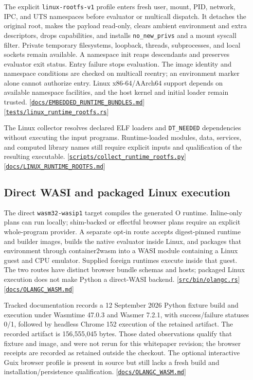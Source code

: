 \documentclass[11pt,oneside]{article}
\newcommand{\src}[1]{\textcolor{OSlate}{\scriptsize[\href{https://github.com/lostadi/OSTADIX/blob/c0b02c326b2329a95ba52447c7180bc93957cd57/#1}{\nolinkurl{#1}}]}\allowbreak}
\begin{document}
The explicit \texttt{linux-rootfs-v1} profile enters fresh user, mount, PID,
network, IPC, and UTS namespaces before evaluator or multicall dispatch. It
detaches the original root, makes the payload read-only, clears ambient
environment and extra descriptors, drops capabilities, and installs
\texttt{no\_new\_privs} and a mount syscall filter. Private temporary
filesystems, loopback, threads, subprocesses, and local sockets remain
available. A namespace init reaps descendants and preserves evaluator exit
status. Entry failure stops evaluation. The image identity and namespace
conditions are checked on multicall reentry; an environment marker alone
cannot authorize entry. Linux x86-64/AArch64 support depends on available
namespace facilities, and the host kernel and initial loader remain trusted.
\src{docs/EMBEDDED_RUNTIME_BUNDLES.md}
\src{tests/linux_runtime_rootfs.rs}

The Linux collector resolves declared ELF loaders and \texttt{DT\_NEEDED}
dependencies without executing the input programs. Runtime-loaded modules,
data, services, and computed library names still require explicit inputs and
qualification of the resulting executable.
\src{scripts/collect_runtime_rootfs.py}
\src{docs/LINUX_RUNTIME_ROOTFS.md}

\subsection{Direct WASI and packaged Linux execution}

The direct \texttt{wasm32-wasip1} target compiles the generated O runtime.
Inline-only plans can run locally; shim-backed or effectful browser plans
require an explicit whole-program provider. A separate opt-in route accepts
digest-pinned runtime and builder images, builds the native evaluator inside
Linux, and packages that environment through container2wasm into a WASI module
containing a Linux guest and CPU emulator. Supplied foreign runtimes execute
inside that guest. The two routes have distinct browser bundle schemas and
hosts; packaged Linux execution does not make Python a direct-WASI backend.
\src{src/bin/olangc.rs}
\src{docs/OLANGC_WASM.md}

Tracked documentation records a 12 September 2026 Python fixture build and
execution under Wasmtime 47.0.3 and Wasmer 7.2.1, with success/failure statuses
0/1, followed by headless Chrome 152 execution of the retained artifact.
The recorded artifact is 156,555,045 bytes. Those dated observations qualify
that fixture and image, and were not rerun for this whitepaper revision; the
browser receipts are recorded as retained outside the checkout. The optional
interactive Guix browser profile is present in source but still lacks a fresh
build and installation/persistence qualification.
\src{docs/OLANGC_WASM.md}
\end{document}
